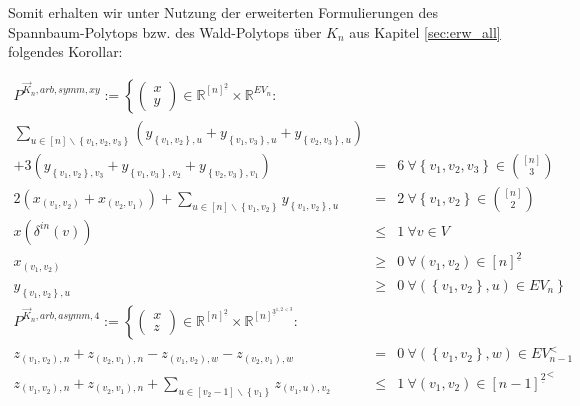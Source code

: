\documentclass[10p,a4paper,BCOR = 12mm, DIV=15]{scrbook}
\begin{document}
Somit erhalten wir unter Nutzung der erweiterten Formulierungen des Spannbaum-Polytops bzw. des Wald-Polytops über $K_n$ aus Kapitel \ref{sec:erw_all} folgendes Korollar:

\begin{Kor}
\begin{eqnarray*}
P^{\vec{K}_n, arb, symm, xy} := \left\{ \left(\begin{array}{c}
x \\
y
\end{array}\right)\in\mathbb{R}^{[n]^{\underline{2}}}\times \mathbb{R}^{EV_n}: \right.
\nonumber & & \\
\sum_{u \in \left[n\right] \backslash \left\{v_1, v_2, v_3\right\}} \left(y_{\left\{v_1, v_2\right\}, u} + y_{\left\{v_1, v_3\right\}, u} + y_{\left\{v_2, v_3\right\}, u}\right) & & \\
+ 3 \left(y_{\left\{v_1, v_2\right\}, v_3} + y_{\left\{v_1, v_3\right\}, v_2} + y_{\left\{v_2, v_3\right\}, v_1}\right) & = & 6 \ \forall \left\{v_1, v_2, v_3\right\}\in {[n] \choose 3} \\
2 \left(x_{\left(v_1, v_2\right)} + x_{\left(v_2, v_1\right)}\right) + \sum_{u\in[n]\backslash\left\{v_1, v_2\right\}} y_{\left\{v_1, v_2\right\}, u} & = & 2\ \forall \left\{v_1, v_2\right\}\in {[n] \choose 2} \\
x\left(\delta^{in}\left(v\right)\right) & \leq & 1 \ \forall v \in V \\
x_{\left(v_1, v_2\right)} & \geq & 0 \ \forall \left(v_1, v_2\right) \in \left[n\right]^{\underline{2}} \nonumber \\
y_{\left\{v_1, v_2\right\}, u} & \geq & 0\nonumber \left. \ \forall \left(\left\{v_1, v_2\right\}, u\right) \in EV_n \right\} \\
P^{\vec{K}_n, arb, asymm, 4} := \left\{
\left(\begin{array}{c}
x \\
z
\end{array}\right)\in \mathbb{R}^{[n]^{\underline{2}}} \times \mathbb{R}^{\left[n\right]^{\underline{3}^{1, 2<3}}}: \nonumber\right. & & \\
z_{\left(v_1, v_2\right), n} + z_{\left(v_2, v_1\right), n} - z_{\left(v_1, v_2\right), w} - z_{\left(v_2, v_1\right), w} & = & 0\ \forall \left(\left\{v_1, v_2\right\}, w\right)\in EV_{n-1}^< \\
z_{\left(v_1, v_2\right), n} + z_{\left(v_2, v_1\right), n} + \sum_{u\in[v_2-1]\backslash\left\{v_1\right\}} z_{\left(v_1, u\right), v_2} & \leq & 1\ \forall \left(v_1, v_2\right)\in {[n-1]^{\underline{2}}}^< \\

\end{eqnarray*}
\end{Kor}
\end{document}
